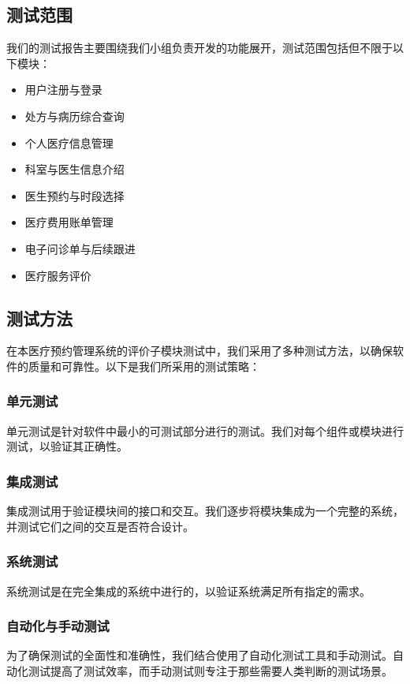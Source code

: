 \subsection{测试范围}
我们的测试报告主要围绕我们小组负责开发的功能展开，测试范围包括但不限于以下模块：
\begin{itemize}
	\item 用户注册与登录
	\item 处方与病历综合查询
	\item 个人医疗信息管理
	\item 科室与医生信息介绍
	\item 医生预约与时段选择
	\item 医疗费用账单管理
	\item 电子问诊单与后续跟进
	\item 医疗服务评价
\end{itemize}

\subsection{测试方法}
在本医疗预约管理系统的评价子模块测试中，我们采用了多种测试方法，以确保软件的质量和可靠性。以下是我们所采用的测试策略：

\subsubsection*{单元测试}
单元测试是针对软件中最小的可测试部分进行的测试。我们对每个组件或模块进行测试，以验证其正确性。

\subsubsection*{集成测试}
集成测试用于验证模块间的接口和交互。我们逐步将模块集成为一个完整的系统，并测试它们之间的交互是否符合设计。

\subsubsection*{系统测试}
系统测试是在完全集成的系统中进行的，以验证系统满足所有指定的需求。

\subsubsection*{自动化与手动测试}
为了确保测试的全面性和准确性，我们结合使用了自动化测试工具和手动测试。自动化测试提高了测试效率，而手动测试则专注于那些需要人类判断的测试场景。

